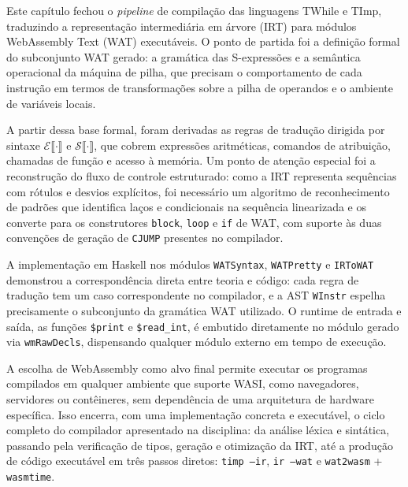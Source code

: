 Este capítulo fechou o \emph{pipeline} de compilação das linguagens TWhile e
TImp, traduzindo a representação intermediária em árvore (IRT) para módulos
WebAssembly Text (WAT) executáveis.  O ponto de partida foi a definição formal
do subconjunto WAT gerado: a gramática das S-expressões e a semântica
operacional da máquina de pilha, que precisam o comportamento de cada
instrução em termos de transformações sobre a pilha de operandos e o ambiente
de variáveis locais.

A partir dessa base formal, foram derivadas as regras de tradução dirigida por
sintaxe $\mathcal{E}\llbracket \cdot \rrbracket$ e
$\mathcal{S}\llbracket \cdot \rrbracket$, que cobrem expressões aritméticas,
comandos de atribuição, chamadas de função e acesso à memória.  Um ponto de
atenção especial foi a reconstrução do fluxo de controle estruturado: como a
IRT representa sequências com rótulos e desvios explícitos, foi necessário um
algoritmo de reconhecimento de padrões que identifica laços e condicionais na
sequência linearizada e os converte para os construtores \texttt{block},
\texttt{loop} e \texttt{if} de WAT, com suporte às duas convenções de geração
de \texttt{CJUMP} presentes no compilador.

A implementação em Haskell nos módulos \texttt{WATSyntax}, \texttt{WATPretty}
e \texttt{IRToWAT} demonstrou a correspondência direta entre teoria e código:
cada regra de tradução tem um caso correspondente no compilador, e a AST
\texttt{WInstr} espelha precisamente o subconjunto da gramática WAT utilizado.
O runtime de entrada e saída, as funções \texttt{\$print} e
\texttt{\$read\_int}, é embutido diretamente no módulo gerado via
\texttt{wmRawDecls}, dispensando qualquer módulo externo em tempo de execução.

A escolha de WebAssembly como alvo final permite executar os programas
compilados em qualquer ambiente que suporte WASI, como navegadores, servidores
ou contêineres, sem dependência de uma arquitetura de hardware específica.
Isso encerra, com uma implementação concreta e executável, o ciclo completo do
compilador apresentado na disciplina: da análise léxica e sintática, passando
pela verificação de tipos, geração e otimização da IRT, até a produção de
código executável em três passos diretos: \texttt{timp --ir},
\texttt{ir --wat} e \texttt{wat2wasm} + \texttt{wasmtime}.
